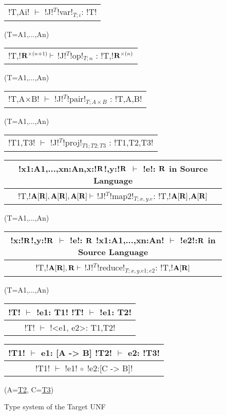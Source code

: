 \begin{figure*}[tb]
    \centering
    \begin{tabular}{c} 
        \\\hline
        !T,Ai! $\vdash$ !J!$^T$!var!$_{T;i}$: !T!
        \end{tabular}(T=A1,...,An)
        \hspace{0.5cm}
        \begin{tabular}{c}
            \\\hline
            !T,!$\mathbf{R}^{\times(n+1)} \vdash$ !J!$^T$!op!$_{T;n}$ : !T,!$\mathbf{R}^{\times(n)}$
        \end{tabular}(T=A1,...,An)
    
        \begin{tabular}{c}
            \\\hline
            !T,A$\times$B! $\vdash$ !J!$^T$!pair!$_{T;A\times B}$ : !T,A,B!
        \end{tabular}(T=A1,...,An)
    
        \begin{tabular}{c}
            \\\hline
            !T1,T3! $\vdash$ !J!$^T$!proj!$_{T1;T2;T3}$ : !T1,T2,T3!
        \end{tabular}
    
        \begin{tabular}{c}
            !x1:A1,...,xn:An,x:!$\mathbf{R}$!,y:!$\mathbf{R}$ $\vdash$ !e!: $\mathbf{R}$ \quad in Source Language
            \\\hline  
            !T,!$\mathbf{A}[\mathbf{R}],\mathbf{A}[\mathbf{R}],\mathbf{A}[\mathbf{R}] \vdash$ !J!$^T$!map2!$_{T; x,y.e}$: !T,!$\mathbf{A}[\mathbf{R}]$,$\mathbf{A}[\mathbf{R}]$
        \end{tabular}(T=A1,...,An)
    
        \begin{tabular}{c}
            !x:!$\mathbf{R}$!,y:!$\mathbf{R}$ $\vdash$ !e!: $\mathbf{R}$ \quad !x1:A1,...,xn:An! $\vdash$ !e2!:$\mathbf{R}$ \quad in Source Language
            \\\hline  
            !T,!$\mathbf{A}[\mathbf{R}],\mathbf{R} \vdash$ !J!$^T$!reduce!$_{T; x,y.e1; e2}$: !T,!$\mathbf{A}[\mathbf{R}]$
        \end{tabular}(T=A1,...,An)

        \begin{tabular}{c}
            !T! $\vdash$ !e1: T1!  \quad !T! $\vdash$ !e1: T2!
            \\ \hline
            !T! $\vdash$ !<e1, e2>: T1,T2!
        \end{tabular}

        \begin{tabular}{c}
            !T1! $\vdash$ e1: [A -> B]  \quad !T2! $\vdash$ e2: !T3! 
            \\ \hline
            !T1! $\vdash$ !e1! $\circ$ !e2:[C -> B]!
        \end{tabular}(A=\underline{T2}, C=\underline{T3})

    \vspace{-0.2cm}
    \caption{Type system of the Target UNF}
    \vspace{-0.4cm}
    \label{fig:target_unf_typesystem}
    \end{figure*}